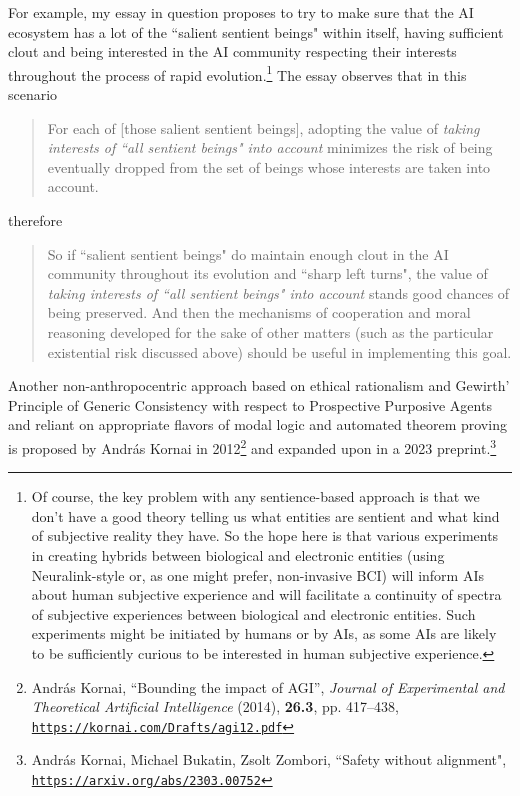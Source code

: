 \documentclass{article}
\begin{document}
For example, my essay in question proposes to try to make sure that the AI ecosystem has
a lot of the ``salient sentient beings" within itself, having sufficient clout and being 
interested in the AI community respecting their interests throughout the process of rapid evolution.\footnote{Of 
course, the key problem with any sentience-based approach is that we don't have a good theory telling us what entities
are sentient and what kind of subjective reality they have. So the hope here is that various experiments in creating
hybrids between biological and electronic entities (using Neuralink-style or, as one might prefer, non-invasive BCI) will inform
AIs about human subjective experience and will facilitate a continuity of spectra of subjective experiences between
biological and electronic entities. Such experiments might be initiated by humans or by AIs, as some AIs are likely to be sufficiently
curious to be interested in human subjective experience.}
The essay observes that in this scenario

\begin{quote}
{\small For each of [those salient sentient beings], adopting the value of {\em taking interests of ``all sentient beings" into account} minimizes the risk of being eventually dropped from the set of beings whose interests are taken into account.}
\end{quote}

therefore

\begin{quote}
{\small So if ``salient sentient beings" do maintain enough clout in the AI community throughout its evolution and ``sharp left turns", the value of {\em taking interests of ``all sentient beings" into account} stands good chances of being preserved. And then the mechanisms of cooperation and moral reasoning developed for the sake of other matters (such as the particular existential risk discussed above) should be useful in implementing this goal.}
\end{quote}

Another non-anthropocentric approach based on ethical rationalism and Gewirth' Principle of Generic Consistency with respect to 
Prospective Purposive Agents and reliant on appropriate flavors of modal logic and 
automated theorem proving is proposed by András Kornai in 2012\footnote{
András Kornai, ``Bounding the impact of AGI”, {\em Journal of Experimental
and Theoretical Artificial Intelligence} (2014), {\bf 26.3}, pp. 417--438,
\href{https://kornai.com/Drafts/agi12.pdf}{\tt https://kornai.com/Drafts/agi12.pdf}}
and expanded upon in a 2023 preprint.\footnote{András Kornai, Michael Bukatin, Zsolt Zombori,
``Safety without alignment", \href{https://arxiv.org/abs/2303.00752}{\tt https://arxiv.org/abs/2303.00752}}
\end{document}
